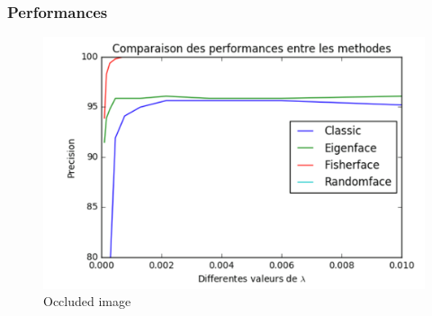 \documentclass{beamer}
\begin{document}

\begin{frame}

		\frametitle{Performances}



			\begin{figure}[!ht]
			\begin{center}
			\includegraphics[scale=0.25]{perf2.png}
			\end{center}
			\caption{Occluded image}
			\label{fa}
			\end{figure}
	
		
\end{frame}




\end{document}
